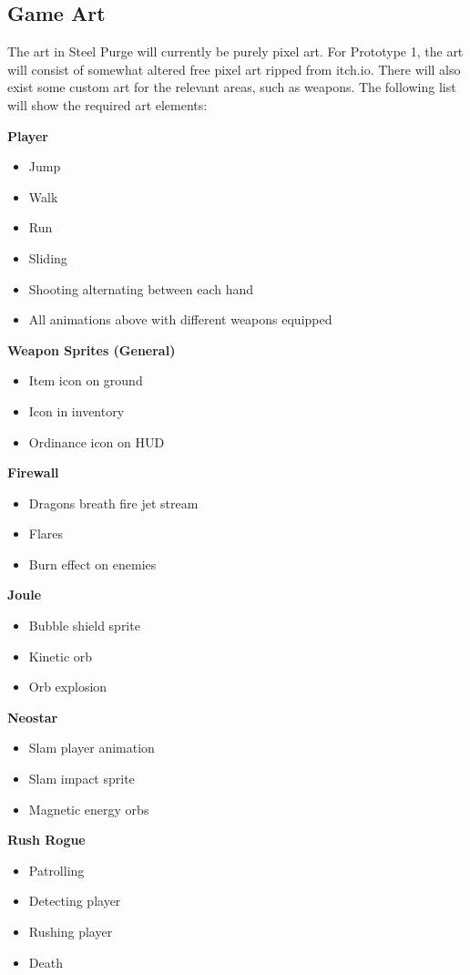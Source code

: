 \documentclass[../Main.tex]{subfiles}
\begin{document}
\subsection{Game Art}

The art in Steel Purge will currently be purely pixel art. For Prototype 1, the art will consist of somewhat altered free pixel art ripped from itch.io. There will also exist some custom art for the relevant areas, such as weapons. The following list will show the required art elements:

\textbf{Player}
\begin{itemize}
	\item Jump
	\item Walk
	\item Run
	\item Sliding
	\item Shooting alternating between each hand
	\item All animations above with different weapons equipped
\end{itemize}

\textbf{Weapon Sprites (General)}
\begin{itemize}
	\item Item icon on ground
	\item Icon in inventory
	\item Ordinance icon on HUD
\end{itemize}


\textbf{Firewall}
\begin{itemize}
	\item Dragons breath fire jet stream
\item Flares
\item Burn effect on enemies 
\end{itemize}

\textbf{Joule}
\begin{itemize}
	\item Bubble shield sprite
	\item Kinetic orb 
	\item Orb explosion
\end{itemize}

\textbf{Neostar}
\begin{itemize}
	\item Slam player animation
	\item Slam impact sprite
	\item Magnetic energy orbs
\end{itemize}

\textbf{Rush Rogue}
\begin{itemize}
	\item Patrolling
	\item Detecting player
	\item Rushing player
	\item Death
\end{itemize}
\end{document}
